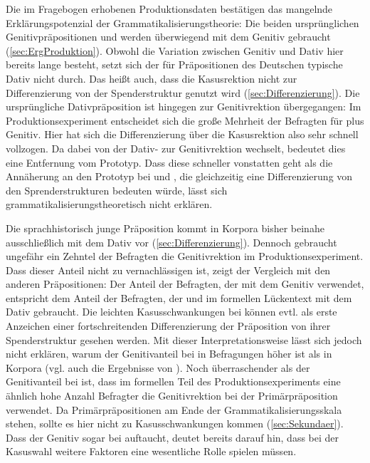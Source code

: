 Die im Fragebogen erhobenen Produktionsdaten bestätigen das mangelnde Erklärungspotenzial der Grammatikalisierungstheorie: 
Die beiden ursprünglichen Genitivpräpositionen \wegen{} und \waehrend{} werden überwiegend mit dem Genitiv gebraucht (\autoref{sec:ErgProduktion}). 
Obwohl die Variation zwischen Genitiv und Dativ hier bereits lange besteht, setzt sich der für Präpositionen des Deutschen typische Dativ nicht durch. 
Das heißt auch, dass die Kasusrektion nicht zur Differenzierung von der Spenderstruktur genutzt wird (\autoref{sec:Differenzierung}). 
Die ursprüngliche Dativpräposition \dank{} ist hingegen zur Genitivrektion übergegangen: 
Im Produktionsexperiment entscheidet sich die große Mehrheit der Befragten für \dank{} plus Genitiv. 
Hier hat sich die Differenzierung über die Kasusrektion also sehr schnell vollzogen. 
Da \dank{} dabei von der Dativ- zur Genitivrektion wechselt, bedeutet dies eine Entfernung vom Prototyp. 
Dass diese schneller vonstatten geht als die Annäherung an den Prototyp bei \wegen{} und \waehrend{}, die gleichzeitig eine Differenzierung von den Sprenderstrukturen bedeuten würde, lässt sich grammatikalisierungstheoretisch nicht erklären. 

Die sprachhistorisch junge Präposition \gegenueber{} kommt in Korpora bisher beinahe ausschließlich mit dem Dativ vor (\autoref{sec:Differenzierung}). 
Dennoch gebraucht ungefähr ein Zehntel der Befragten die Genitivrektion im Produktionsexperiment.
Dass dieser Anteil nicht zu vernachlässigen ist, zeigt der Vergleich mit den anderen Präpositionen: 
Der Anteil der Befragten, der \gegenueber{} mit dem Genitiv verwendet, entspricht dem Anteil der Befragten, der \waehrend{} und \dank{} im formellen Lückentext mit dem Dativ gebraucht. 
Die leichten Kasusschwankungen bei \gegenueber{} können evtl. als erste Anzeichen einer fortschreitenden Differenzierung der Präposition von ihrer Spenderstruktur gesehen werden. 
Mit dieser Interpretationsweise lässt sich jedoch nicht erklären, warum der Genitivanteil bei \gegenueber{} in Befragungen höher ist als in Korpora (vgl. auch die Ergebnisse von \citealp{Becker2011}). 
Noch überraschender als der Genitivanteil bei \gegenueber{} ist, dass im formellen Teil des Produktionsexperiments eine ähnlich hohe Anzahl Befragter die Genitivrektion bei der Primärpräposition  verwendet.
Da Primärpräpositionen am Ende der Grammatikalisierungsskala stehen, sollte es hier nicht zu Kasusschwankungen kommen (\autoref{sec:Sekundaer}). 
Dass der Genitiv sogar bei  auftaucht, deutet bereits darauf hin, dass bei der Kasuswahl weitere Faktoren eine wesentliche Rolle spielen müssen. 

